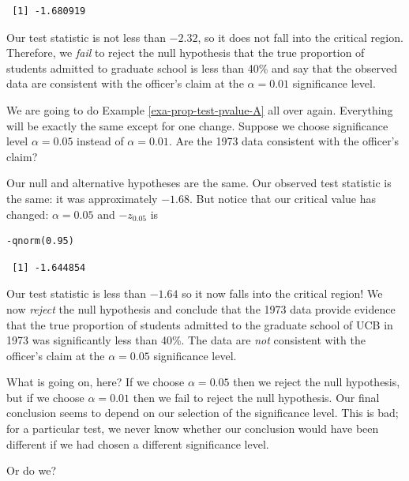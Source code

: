 \documentclass[captions=tableheading]{scrbook}
\begin{document}
\begin{example}
\begin{verbatim}
 [1] -1.680919
\end{verbatim}

Our test statistic is not less than \(-2.32\), so it does not fall into the critical region. Therefore, we \emph{fail} to reject the null hypothesis that the true proportion of students admitted to graduate school is less than 40\% and say that the observed data are consistent with the officer's claim at the \(\alpha=0.01\) significance level. 

\end{example}

\begin{example}
We are going to do Example \ref{exa-prop-test-pvalue-A} all over again. Everything will be exactly the same except for one change. Suppose we choose significance level \(\alpha=0.05\) instead of \(\alpha=0.01\). Are the 1973 data consistent with the officer's claim?

Our null and alternative hypotheses are the same. Our observed test statistic is the same: it was approximately \(-1.68\). But notice that our critical value has changed: \(\alpha=0.05\) and \(-z_{0.05}\) is 
\end{example}

\lstset{language=R}
\begin{lstlisting}
-qnorm(0.95)
\end{lstlisting}

\begin{verbatim}
 [1] -1.644854
\end{verbatim}

Our test statistic is less than \(-1.64\) so it now falls into the critical region! We now \emph{reject} the null hypothesis and conclude that the 1973 data provide evidence that the true proportion of students admitted to the graduate school of UCB in 1973 was significantly less than 40\%. The data are \emph{not} consistent with the officer's claim at the \(\alpha=0.05\) significance level.

What is going on, here? If we choose \(\alpha=0.05\) then we reject the null hypothesis, but if we choose \(\alpha=0.01\) then we fail to reject the null hypothesis. Our final conclusion seems to depend on our selection of the significance level. This is bad; for a particular test, we never know whether our conclusion would have been different if we had chosen a different significance level. 

Or do we?
\end{document}
